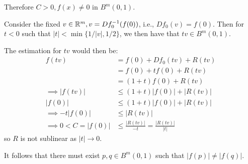 \documentclass[a4paper, 12pt]{article}
\begin{document}
\begin{solution}
    Therefore $C > 0, f(x) \neq 0$ in $B^m(0, 1)$.

    Consider the fixed $v \in \mathbb{R}^m, v = Df_0^{-1}(f(0))$, i.e., $Df_0(v) = f(0)$. Then for $t < 0$ such that $|t| < \min\{1/|v|, 1/2\}$, we then have that $tv \in B^m (0, 1)$.

    The estimation for $tv$ would then be:
    \begin{align*}
        f(tv)                   & = f(0) + Df_0(tv) + R(tv)                     \\
                                & = f(0) + tf(0) + R(tv)                        \\
                                & = (1+t) f(0) + R(tv)                          \\
        \implies |f(tv)|        & \leq (1+t)|f(0)| + |R(tv)|                    \\
        |f(0)|                  & \leq (1+t)|f(0)| + |R(tv)|                  \\
        \implies -t|f(0)|       & \leq |R(tv)|                                  \\
        \implies 0 < C = |f(0)| & \leq \frac{|R(tv)|}{-t} = \frac{|R(tv)|}{|t|}
    \end{align*}
    so $R$ is not sublinear as $|t| \to 0$.

    It follows that there must exist $p, q \in B^m(0, 1)$ such that $|f(p)| \neq |f(q)|$.
\end{solution}
\end{document}
